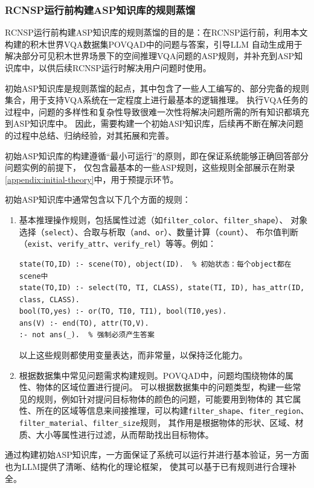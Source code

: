 \subsubsection{RCNSP运行前构建ASP知识库的规则蒸馏}
RCNSP运行前构建ASP知识库的规则蒸馏的目的是：在RCNSP运行前，利用本文构建的积木世界VQA数据集POVQAD中的问题与答案，引导LLM
自动生成用于解决部分可见积木世界场景下的空间推理VQA问题的ASP规则，并补充到ASP知识库中，以供后续RCNSP运行时解决用户问题时使用。

初始ASP知识库是规则蒸馏的起点，其中包含了一些人工编写的、部分完备的规则集合，用于支持VQA系统在一定程度上进行最基本的逻辑推理。
执行VQA任务的过程中，问题的多样性和复杂性导致很难一次性将解决问题所需的所有知识都填充到ASP知识库中。
因此，需要构建一个初始ASP知识库，后续再不断在解决问题的过程中总结、归纳经验，对其拓展和完善。

初始ASP知识库的构建遵循“最小可运行”的原则，即在保证系统能够正确回答部分问题实例的前提下，
仅包含最基本的一些ASP规则，这些规则全部展示在附录\ref{appendix:initial-theory}中，用于预提示环节。

初始ASP知识库中通常包含以下几个方面的规则：
\begin{enumerate}[nosep]
\item 基本推理操作规则，包括属性过滤（如\texttt{filter\_color}、\texttt{filter\_shape}）、
对象选择（\texttt{select}）、合取与析取（\texttt{and}、\texttt{or}）、数量计算（\texttt{count}）、
布尔值判断（\texttt{exist}、\texttt{verify\_attr}、\texttt{verify\_rel}）等等。例如：
\begin{lstlisting}
state(TO,ID) :- scene(TO), object(ID).  % 初始状态：每个object都在scene中
state(TO,ID) :- select(TO, TI, CLASS), state(TI, ID), has_attr(ID, class, CLASS).
bool(TO,yes) :- or(TO, TI0, TI1), bool(TI0,yes).
ans(V) :- end(TO), attr(TO,V).
:- not ans(_).  % 强制必须产生答案
\end{lstlisting}
以上这些规则都使用变量表达，而非常量，以保持泛化能力。
\item 根据数据集中常见问题需求构建规则。POVQAD中，问题均围绕物体的属性、物体的区域位置进行提问。
可以根据数据集中的问题类型，构建一些常见的规则，例如针对提问目标物体的颜色的问题，可能要用到物体的
其它属性、所在的区域等信息来间接推理，可以构建\texttt{filter\_shape}、\texttt{fiter\_region}、
\texttt{filter\_material}、\texttt{filter\_size}规则，
其作用是根据物体的形状、区域、材质、大小等属性进行过滤，从而帮助找出目标物体。
\end{enumerate}

通过构建初始ASP知识库，一方面保证了系统可以运行并进行基本验证，另一方面也为LLM提供了清晰、结构化的理论框架，
使其可以基于已有规则进行合理补全。


